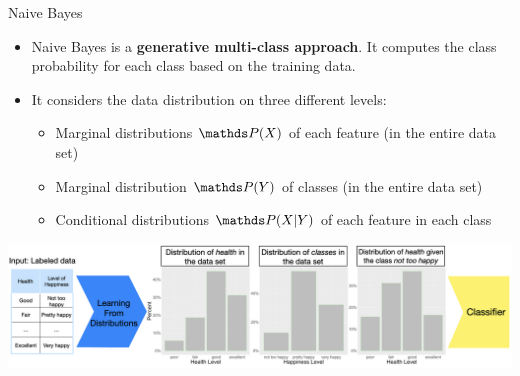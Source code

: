 \documentclass[11pt,compress,t,notes=noshow, xcolor=table]{beamer}
\begin{document}
\begin{vbframe}{Naive Bayes}
\begin{itemize}
\item \small Naive Bayes is a \textbf{generative multi-class approach}. It computes the class probability for each class based on the training data.
\item \small It considers the data distribution on three different levels:
    \begin{itemize}
    \item \small Marginal distributions $\P(X)$ of each feature (in the entire data set)
    \item \small Marginal distribution $\P(Y)$ of classes (in the entire data set)
    \item \small Conditional distributions $\P(X|Y)$ of each feature in each class
    \end{itemize}
\vspace*{1cm}
\end{itemize}
\begin{center}
  \includegraphics[width=1\textwidth]{figure_man/nutshell-classif-distributions_learning.png}
\end{center}


\end{vbframe}
\end{document}
